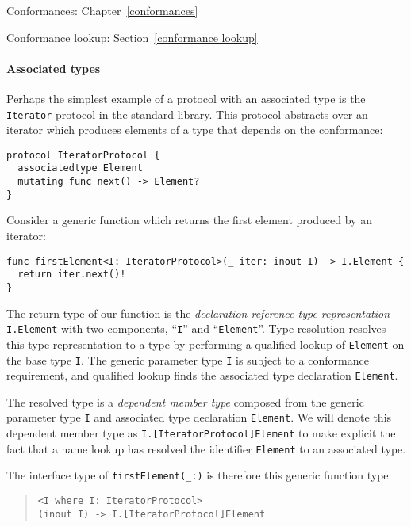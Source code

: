 \documentclass[a4paper,headsepline,bibliography=totoc,toc=flat,fleqn,twoside=semi]{scrbook}
\theoremstyle{definition}
\theoremstyle{definition}
\theoremstyle{definition}
\begin{document}
\begin{MoreDetails}
\item Conformances: Chapter~\ref{conformances}
\item Conformance lookup: Section~\ref{conformance lookup}
\end{MoreDetails}

\paragraph{Associated types} Perhaps the simplest example of a protocol with an associated type is the \texttt{Iterator} protocol in the standard library. This protocol abstracts over an iterator which produces elements of a type that depends on the conformance:
\begin{Verbatim}
protocol IteratorProtocol {
  associatedtype Element
  mutating func next() -> Element?
}
\end{Verbatim}
Consider a generic function which returns the first element produced by an iterator:
\begin{Verbatim}
func firstElement<I: IteratorProtocol>(_ iter: inout I) -> I.Element {
  return iter.next()!
}
\end{Verbatim}
The return type of our function is the \emph{declaration reference type representation} \texttt{I.Element} with two components, ``\texttt{I}'' and ``\texttt{Element}''. Type resolution resolves this type representation to a type by performing a qualified lookup of \texttt{Element} on the base type \texttt{I}. The generic parameter type \texttt{I} is subject to a conformance requirement, and qualified lookup finds the associated type declaration \texttt{Element}.

The resolved type is a \emph{dependent member type} composed from the generic parameter type \texttt{I} and associated type declaration \texttt{Element}. We will denote this dependent member type as \verb|I.[IteratorProtocol]Element| to make explicit the fact that a name lookup has resolved the identifier \texttt{Element} to an associated type.

The interface type of \verb|firstElement(_:)| is therefore this generic function type:
\begin{quote}
\begin{verbatim}
<I where I: IteratorProtocol>
(inout I) -> I.[IteratorProtocol]Element
\end{verbatim}
\end{quote}
\end{document}
